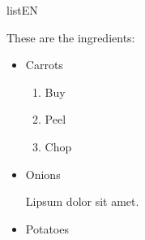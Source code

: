 \begin{saveblock}{listEN}
                
    \begin{highlightblock}[linewidth=0.5\textwidth,gobble=8]
        These are the ingredients:
        \begin{itemize}
            \item Carrots
            \begin{enumerate}
                \item Buy
                \item Peel
                \item Chop
            \end{enumerate}
            \item Onions
            
            Lipsum dolor sit amet.
            \item Potatoes
        \end{itemize}
    \end{highlightblock}
\end{saveblock}

